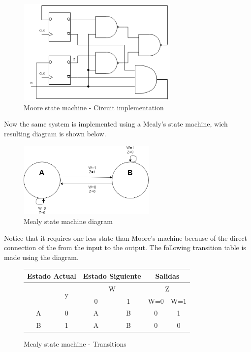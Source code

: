 \begin{figure}[H]
    \begin{centering}
    \includegraphics[width=0.7\textwidth]{data/Graficos3/3a_Compuertas_Moore.png}
    \par\end{centering}
    \caption{Moore state machine - Circuit implementation}
\end{figure}

Now the same system is implemented using a Mealy's 
state machine, wich resulting diagram is shown below.

\begin{figure}[H]
    \begin{centering}
    \includegraphics[width=0.6\textwidth]{data/Graficos3/3b_fsm.png}
    \par\end{centering}
    \caption{Mealy state machine diagram}
\end{figure}

Notice that it requires one less state than Moore's
machine because of the direct connection of the 
from the input to the output. 
The following 
transition table is made using the diagram.

\begin{figure}[H]
    \begin{center}
        \begin{tabular}{|c|c|c|c||c|c|}
            \hline 
            \multicolumn{2}{|c|}{Estado Actual} & \multicolumn{2}{c||}{Estado Siguiente} & \multicolumn{2}{c|}{Salidas}\tabularnewline
            \hline 
            \hline 
            \multirow{2}{*}{} & \multirow{2}{*}{y} & \multicolumn{2}{c||}{W} & \multicolumn{2}{c|}{Z}\tabularnewline
            \cline{3-6} 
             &  & \multicolumn{1}{c|}{0} & \multicolumn{1}{c||}{1} & W=0 & W=1\tabularnewline
            \hline 
            A & 0 & A & B & 0 & 1\tabularnewline
            \hline 
            B & 1 & A & B & 0 & 0\tabularnewline
            \hline 
            \end{tabular}
        \caption{Mealy state machine - Transitions}
    \end{center}
\end{figure}

